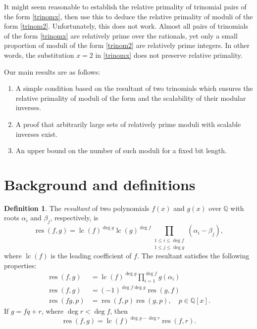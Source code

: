 \documentclass[]{article}
\theoremstyle{definition}
\newtheorem{definition}{Definition}
\DeclareMathOperator{\res}{res}
\DeclareMathOperator{\lc}{lc}
\begin{document}
It might seem reasonable to establish the relative primality of trinomial pairs
of the form \eqref{trinomx}, then use this to deduce the relative primality of
moduli of the form \eqref{trinom2}. Unfortunately, this does not work. Almost
all pairs of trinomials of the form \eqref{trinomx} are relatively prime over
the rationals, yet only a small proportion of moduli of the form \eqref{trinom2}
are relatively prime integers. In other words, the substitution $x = 2$ in
\eqref{trinomx} does not preserve relative primality.

Our main results are as follows:
\begin{enumerate}
    \item A simple condition based on the resultant of two trinomials which
    ensures the relative primality of moduli of the form and the scalability of
    their modular inverses.
    \item A proof that arbitrarily large sets of relatively prime moduli with scalable inverses exist.
    \item An upper bound on the number of such moduli for a fixed bit length.
\end{enumerate}

\section{Background and definitions}

\begin{definition}
    The \emph{resultant} of two polynomials $f(x)$ and $g(x)$ over $\mathbb{Q}$
    with roots $\alpha_i$ and $\beta_j$, respectively, is
    \begin{equation*}
        \res(f, g) = \lc(f)^{\deg g} \lc(g)^{\deg f} \prod_{\substack{1 \leq i \leq \deg f \\ 1 \leq j \leq \deg g}} (\alpha_i - \beta_j),
    \end{equation*}
    where $\lc(f)$ is the leading coefficient of $f$. The resultant satisfies
    the following properties:
    \begin{align*}
        \res(f, g) &= \lc(f)^{\deg g} \prod_{i = 1}^{\deg f} g(\alpha_i) \\
        \res(f, g) &= (-1)^{\deg f \deg g} \res(g, f) \\
        \res(fg, p) &= \res(f, p) \res(g, p), \quad p \in \mathbb{Q}[x].
    \end{align*}
    If $g = fq + r$, where $\deg r < \deg f$, then
    \begin{equation*}
        \res(f, g) = \lc(f)^{\deg g - \deg r} \res(f, r).
    \end{equation*}
\end{definition}
\end{document}
